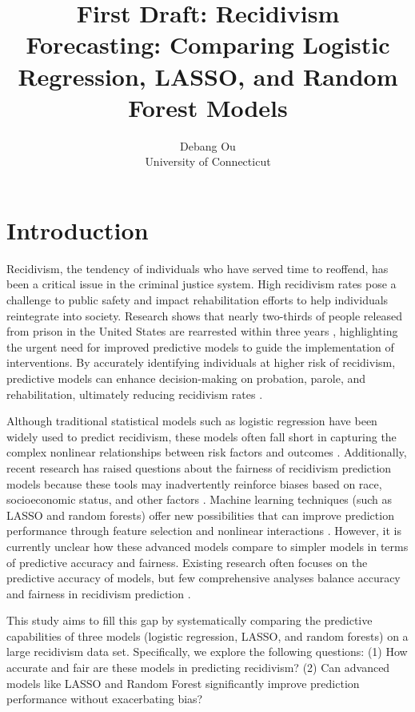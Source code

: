 \documentclass[12pt]{article}
\title{First Draft: Recidivism Forecasting: Comparing Logistic Regression, LASSO, and Random Forest Models}
\author{Debang Ou\\
  University of Connecticut
}
\begin{document}
\maketitle

\section{Introduction}
Recidivism, the tendency of individuals who have served time to reoffend, has been a critical issue in the criminal justice system. High recidivism rates pose a challenge to public safety and impact rehabilitation efforts to help individuals reintegrate into society. Research shows that nearly two-thirds of people released from prison in the United States are rearrested within three years \citep{Durose2014}, highlighting the urgent need for improved predictive models to guide the implementation of interventions. By accurately identifying individuals at higher risk of recidivism, predictive models can enhance decision-making on probation, parole, and rehabilitation, ultimately reducing recidivism rates \citep{Berk2009}.

Although traditional statistical models such as logistic regression have been widely used to predict recidivism, these models often fall short in capturing the complex nonlinear relationships between risk factors and outcomes \citep{James2013}. Additionally, recent research has raised questions about the fairness of recidivism prediction models because these tools may inadvertently reinforce biases based on race, socioeconomic status, and other factors \citep{Angwin2016, Chouldechova2017}. Machine learning techniques (such as LASSO and random forests) offer new possibilities that can improve prediction performance through feature selection and nonlinear interactions \citep{Hastie2015}. However, it is currently unclear how these advanced models compare to simpler models in terms of predictive accuracy and fairness. Existing research often focuses on the predictive accuracy of models, but few comprehensive analyses balance accuracy and fairness in recidivism prediction \citep{Berk2018}.

This study aims to fill this gap by systematically comparing the predictive capabilities of three models (logistic regression, LASSO, and random forests) on a large recidivism data set. Specifically, we explore the following questions: (1) How accurate and fair are these models in predicting recidivism? (2) Can advanced models like LASSO and Random Forest significantly improve prediction performance without exacerbating bias? 
\end{document}
